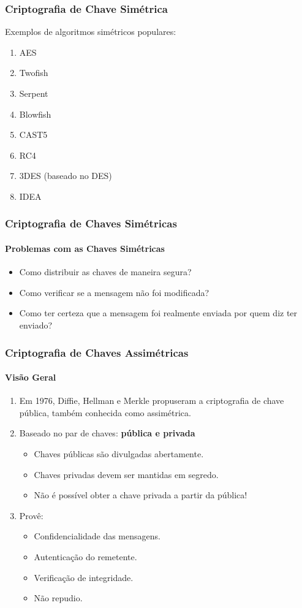 \documentclass[compress]{beamer}
\begin{document}
\begin{frame}
\frametitle{Criptografia de Chave Simétrica}
\justifying Exemplos de algoritmos simétricos populares:
	\begin{enumerate}
	\item AES
	\item Twofish
	\item Serpent
	\item Blowfish
	\item CAST5
	\item RC4
	\item 3DES (baseado no DES)
	\item IDEA
	\end{enumerate}
\end{frame}

\begin{frame}
\frametitle{Criptografia de Chaves Simétricas}
\framesubtitle{Problemas com as Chaves Simétricas}
	\begin{itemize}
		\item<+->{Como distribuir as chaves de maneira segura?}
		\item<+->{Como verificar se a mensagem não foi modificada?}
		\item<+->{Como ter certeza que a mensagem foi realmente enviada por quem diz ter enviado?}
	\end{itemize}
\end{frame}

\begin{frame}
\frametitle{Criptografia de Chaves Assimétricas}
\framesubtitle{Visão Geral}
\begin{enumerate}
	\item<+->{Em 1976, Diffie, Hellman e Merkle propuseram a criptografia de chave pública, também conhecida como assimétrica.}
	\item<+->{Baseado no par de chaves: \textbf{pública e privada}}
	\begin{itemize}
		\item<+->{Chaves públicas são divulgadas abertamente.}
		\item<+->{Chaves privadas devem ser mantidas em segredo.}
		\item<+->{Não é possível obter a chave privada a partir da pública!}
	\end{itemize}
	\item<+->{Provê:}
	\begin{itemize}
		\item<+->{Confidencialidade das mensagens.}
		\item<+->{Autenticação do remetente.}
		\item<+->{Verificação de integridade.}
		\item<+->{Não repudio.}
	\end{itemize}
\end{enumerate}
\end{frame}
\end{document}
